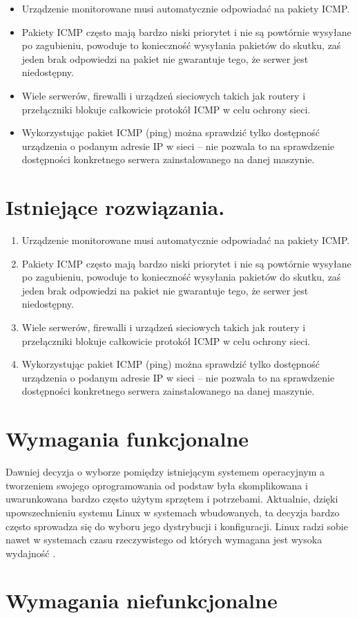 \begin{itemize}
	\item Urządzenie monitorowane musi automatycznie odpowiadać na pakiety ICMP.
	\item Pakiety ICMP często mają bardzo niski priorytet i nie są powtórnie wysyłane po zagubieniu, powoduje to konieczność wysyłania pakietów do skutku, zaś jeden brak odpowiedzi na pakiet nie gwarantuje tego, że serwer jest niedostępny.
	\item Wiele serwerów, firewalli i urządzeń sieciowych takich jak routery i przełączniki blokuje całkowicie protokół ICMP w celu ochrony sieci.
	\item Wykorzystując pakiet ICMP (ping) można sprawdzić tylko dostępność urządzenia o podanym adresie IP w sieci – nie pozwala to na sprawdzenie dostępności konkretnego serwera zainstalowanego na danej maszynie.
\end{itemize}

\section{Istniejące rozwiązania.}

\begin{enumerate}
	\item Urządzenie monitorowane musi automatycznie odpowiadać na pakiety ICMP.
	\item Pakiety ICMP często mają bardzo niski priorytet i nie są powtórnie wysyłane po zagubieniu, powoduje to konieczność wysyłania pakietów do skutku, zaś jeden brak odpowiedzi na pakiet nie gwarantuje tego, że serwer jest niedostępny.
	\item Wiele serwerów, firewalli i urządzeń sieciowych takich jak routery i przełączniki blokuje całkowicie protokół ICMP w celu ochrony sieci.
	\item Wykorzystując pakiet ICMP (ping) można sprawdzić tylko dostępność urządzenia o podanym adresie IP w sieci – nie pozwala to na sprawdzenie dostępności konkretnego serwera zainstalowanego na danej maszynie.
\end{enumerate}

\section{Wymagania funkcjonalne}

Dawniej decyzja o wyborze pomiędzy istniejącym systemem operacyjnym a tworzeniem swojego oprogramowania od podstaw była skomplikowana i uwarunkowana bardzo często użytym sprzętem i potrzebami. Aktualnie, dzięki upowszechnieniu systemu Linux w systemach wbudowanych, ta decyzja bardzo często sprowadza się do wyboru jego dystrybucji i konfiguracji. Linux radzi sobie nawet w systemach czasu rzeczywistego od których wymagana jest wysoka wydajność \cite{ProLinuxEmbedded, AnalysisAndSynthesis}.

\section{Wymagania niefunkcjonalne}